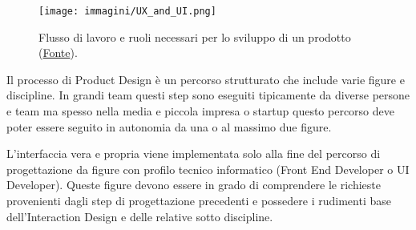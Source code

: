 

\begin{figure}[!h]
	\centering
	\texttt{[image: immagini/UX\_and\_UI.png]}
	\caption{Flusso di lavoro e ruoli necessari per lo sviluppo di un prodotto
	(\href{https://www.crayondata.com/blog/the-difference-between-ui-and-ux/}{Fonte}).}
\end{figure}

Il processo di Product Design è un percorso strutturato che include varie figure e discipline. In grandi team questi step sono eseguiti
tipicamente da diverse persone e team ma spesso nella media e piccola impresa o startup questo percorso deve poter essere seguito in autonomia da una
o al massimo due figure.

L'interfaccia vera e propria viene implementata solo alla fine del percorso di progettazione da figure con profilo tecnico informatico
(Front End Developer o UI Developer). Queste figure devono essere in grado di comprendere le richieste provenienti dagli step di progettazione
precedenti e possedere i rudimenti base dell'Interaction Design e delle relative sotto discipline.


